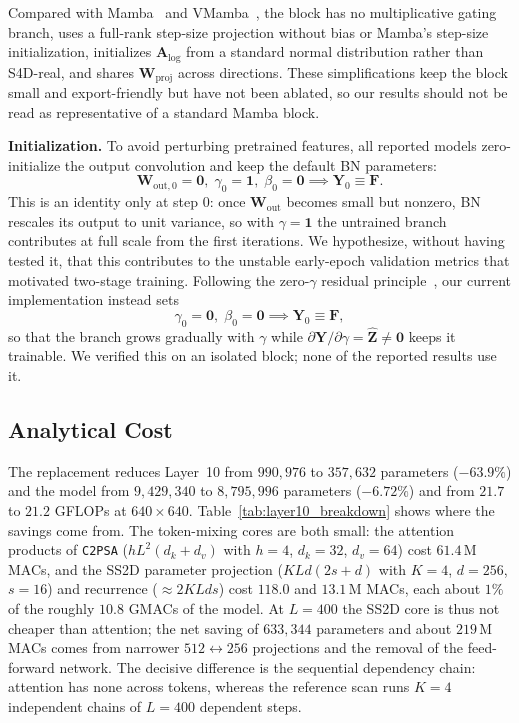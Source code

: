 Compared with Mamba~\cite{gu2023mamba} and VMamba~\cite{liu2024vmamba}, the block has no multiplicative gating branch, uses a full-rank step-size projection without bias or Mamba's step-size initialization, initializes $\mathbf{A}_{\text{log}}$ from a standard normal distribution rather than S4D-real, and shares $\mathbf{W}_{\text{proj}}$ across directions. These simplifications keep the block small and export-friendly but have not been ablated, so our results should not be read as representative of a standard Mamba block.

\textbf{Initialization.} To avoid perturbing pretrained features, all reported models zero-initialize the output convolution and keep the default BN parameters:
\begin{equation}
    \mathbf{W}_{\text{out},0} = \mathbf{0}, \; \gamma_0 = \mathbf{1}, \; \beta_0 = \mathbf{0} \implies \mathbf{Y}_0 \equiv \mathbf{F}.
    \label{eq:zero_wout}
\end{equation}
This is an identity only at step $0$: once $\mathbf{W}_{\text{out}}$ becomes small but nonzero, BN rescales its output to unit variance, so with $\gamma = \mathbf{1}$ the untrained branch contributes at full scale from the first iterations. We hypothesize, without having tested it, that this contributes to the unstable early-epoch validation metrics that motivated two-stage training. Following the zero-$\gamma$ residual principle~\cite{goyal2017accurate}, our current implementation instead sets
\begin{equation}
    \gamma_0 = \mathbf{0}, \; \beta_0 = \mathbf{0} \implies \mathbf{Y}_0 \equiv \mathbf{F},
    \label{eq:zero_gamma}
\end{equation}
so that the branch grows gradually with $\gamma$ while $\partial \mathbf{Y} / \partial \gamma = \hat{\mathbf{Z}} \neq \mathbf{0}$ keeps it trainable. We verified this on an isolated block; none of the reported results use it.

\subsection{Analytical Cost}
\label{sec:complexity}
The replacement reduces Layer~10 from $990{,}976$ to $357{,}632$ parameters ($-63.9\%$) and the model from $9{,}429{,}340$ to $8{,}795{,}996$ parameters ($-6.72\%$) and from $21.7$ to $21.2$ GFLOPs at $640 \times 640$. Table~\ref{tab:layer10_breakdown} shows where the savings come from. The token-mixing cores are both small: the attention products of \texttt{C2PSA} ($h L^2 (d_k + d_v)$ with $h = 4$, $d_k = 32$, $d_v = 64$) cost $61.4$\,M MACs, and the SS2D parameter projection ($K L d (2s + d)$ with $K = 4$, $d = 256$, $s = 16$) and recurrence ($\approx 2 K L d s$) cost $118.0$ and $13.1$\,M MACs, each about $1\%$ of the roughly $10.8$ GMACs of the model. At $L = 400$ the SS2D core is thus not cheaper than attention; the net saving of $633{,}344$ parameters and about $219$\,M MACs comes from narrower $512 \leftrightarrow 256$ projections and the removal of the feed-forward network. The decisive difference is the sequential dependency chain: attention has none across tokens, whereas the reference scan runs $K = 4$ independent chains of $L = 400$ dependent steps.

